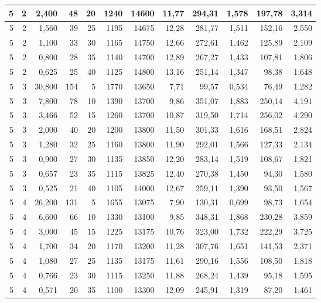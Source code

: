 \begin{tabular}{rrrrrrrrrrrr}
5 & 2 & 2,400 & 48 & 20 & 1240 & 14600 & 11,77 & 294,31 & 1,578 & 197,78 & 3,314 \\ \hline
5 & 2 & 1,560 & 39 & 25 & 1195 & 14675 & 12,28 & 281,77 & 1,511 & 152,16 & 2,550 \\ \hline
5 & 2 & 1,100 & 33 & 30 & 1165 & 14750 & 12,66 & 272,61 & 1,462 & 125,89 & 2,109 \\ \hline
5 & 2 & 0,800 & 28 & 35 & 1140 & 14700 & 12,89 & 267,27 & 1,433 & 107,81 & 1,806 \\ \hline
5 & 2 & 0,625 & 25 & 40 & 1125 & 14800 & 13,16 & 251,14 & 1,347 & 98,38 & 1,648 \\ \hline
5 & 3 & 30,800 & 154 & 5 & 1770 & 13650 & 7,71 & 99,57 & 0,534 & 76,49 & 1,282 \\ \hline
5 & 3 & 7,800 & 78 & 10 & 1390 & 13700 & 9,86 & 351,07 & 1,883 & 250,14 & 4,191 \\ \hline
5 & 3 & 3,466 & 52 & 15 & 1260 & 13700 & 10,87 & 319,50 & 1,714 & 256,02 & 4,290 \\ \hline
5 & 3 & 2,000 & 40 & 20 & 1200 & 13800 & 11,50 & 301,33 & 1,616 & 168,51 & 2,824 \\ \hline
5 & 3 & 1,280 & 32 & 25 & 1160 & 13800 & 11,90 & 292,01 & 1,566 & 127,33 & 2,134 \\ \hline
5 & 3 & 0,900 & 27 & 30 & 1135 & 13850 & 12,20 & 283,14 & 1,519 & 108,67 & 1,821 \\ \hline
5 & 3 & 0,657 & 23 & 35 & 1115 & 13825 & 12,40 & 270,38 & 1,450 & 94,30 & 1,580 \\ \hline
5 & 3 & 0,525 & 21 & 40 & 1105 & 14000 & 12,67 & 259,11 & 1,390 & 93,50 & 1,567 \\ \hline
5 & 4 & 26,200 & 131 & 5 & 1655 & 13075 & 7,90 & 130,31 & 0,699 & 98,73 & 1,654 \\ \hline
5 & 4 & 6,600 & 66 & 10 & 1330 & 13100 & 9,85 & 348,31 & 1,868 & 230,28 & 3,859 \\ \hline
5 & 4 & 3,000 & 45 & 15 & 1225 & 13175 & 10,76 & 323,00 & 1,732 & 222,29 & 3,725 \\ \hline
5 & 4 & 1,700 & 34 & 20 & 1170 & 13200 & 11,28 & 307,76 & 1,651 & 141,53 & 2,371 \\ \hline
5 & 4 & 1,080 & 27 & 25 & 1135 & 13175 & 11,61 & 290,16 & 1,556 & 108,50 & 1,818 \\ \hline
5 & 4 & 0,766 & 23 & 30 & 1115 & 13250 & 11,88 & 268,24 & 1,439 & 95,18 & 1,595 \\ \hline
5 & 4 & 0,571 & 20 & 35 & 1100 & 13300 & 12,09 & 245,91 & 1,319 & 87,20 & 1,461 \\ \hline

\end{tabular}

